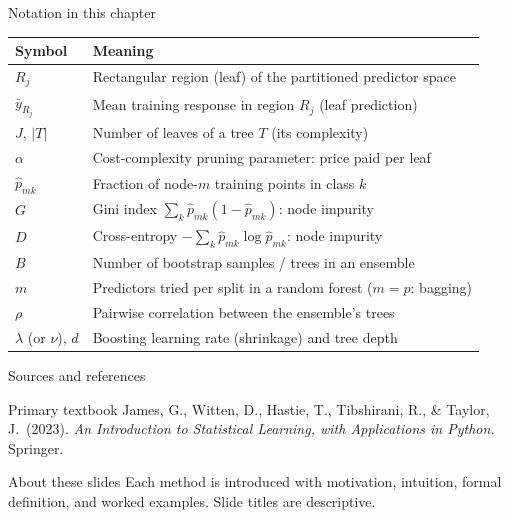 \documentclass[aspectratio=169,11pt]{beamer}
\begin{document}
\begin{frame}{Notation in this chapter}
  \footnotesize
  \begin{center}
  \begin{tabular}{@{}ll@{}}
    \toprule
    \textbf{Symbol} & \textbf{Meaning} \\
    \midrule
    $R_j$ & Rectangular region (leaf) of the partitioned predictor space \\
    $\bar y_{R_j}$ & Mean training response in region $R_j$ (leaf prediction) \\
    $J$, $|T|$ & Number of leaves of a tree $T$ (its complexity) \\
    $\alpha$ & Cost-complexity pruning parameter: price paid per leaf \\
    $\hat p_{mk}$ & Fraction of node-$m$ training points in class $k$ \\
    $G$ & Gini index $\sum_k \hat p_{mk}(1-\hat p_{mk})$: node impurity \\
    $D$ & Cross-entropy $-\sum_k \hat p_{mk}\log\hat p_{mk}$: node impurity \\
    $B$ & Number of bootstrap samples / trees in an ensemble \\
    $m$ & Predictors tried per split in a random forest ($m=p$: bagging) \\
    $\rho$ & Pairwise correlation between the ensemble's trees \\
    $\lambda$ (or $\nu$), $d$ & Boosting learning rate (shrinkage) and tree depth \\
    \bottomrule
  \end{tabular}
  \end{center}
\end{frame}

\begin{frame}{Sources and references}
  \begin{block}{Primary textbook}
    James, G., Witten, D., Hastie, T., Tibshirani, R., \& Taylor, J.\ (2023).
    \emph{An Introduction to Statistical Learning, with Applications in
    Python.} Springer.
  \end{block}
  \begin{block}{About these slides}
    Each method is introduced with motivation, intuition, formal
    definition, and worked examples. Slide titles are descriptive.
  \end{block}
\end{frame}
\end{document}
